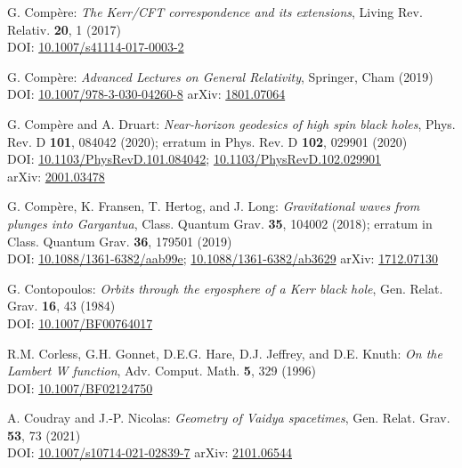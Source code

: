\begin{thebibliography}{123}
G. Compère:
{\em The Kerr/CFT correspondence and its extensions},
Living Rev. Relativ. {\bf 20}, 1 (2017)\\
DOI: \href{https://doi.org/10.1007/s41114-017-0003-2}{10.1007/s41114-017-0003-2}

G. Compère:
{\em Advanced Lectures on General Relativity},
Springer, Cham (2019)\\
DOI: \href{https://doi.org/10.1007/978-3-030-04260-8}{10.1007/978-3-030-04260-8}\hfill
arXiv: \href{https://arxiv.org/abs/1801.07064}{1801.07064}

G. Compère and A. Druart:
{\em Near-horizon geodesics of high spin black holes},
Phys. Rev. D {\bf 101}, 084042 (2020); erratum in Phys. Rev. D {\bf 102}, 029901 (2020)\\
DOI: \href{https://doi.org/10.1103/PhysRevD.101.084042}{10.1103/PhysRevD.101.084042};
\href{https://doi.org/10.1103/PhysRevD.102.029901}{10.1103/PhysRevD.102.029901}\\
arXiv: \href{https://arxiv.org/abs/2001.03478}{2001.03478}

G. Compère, K. Fransen, T. Hertog, and J. Long:
{\em Gravitational waves from plunges into Gargantua},
Class. Quantum Grav. {\bf 35}, 104002 (2018);
erratum in Class. Quantum Grav. {\bf 36}, 179501 (2019) \\
DOI: \href{https://doi.org/10.1088/1361-6382/aab99e}{10.1088/1361-6382/aab99e};
\href{https://doi.org/10.1088/1361-6382/ab3629}{10.1088/1361-6382/ab3629}
\hfill
arXiv: \href{https://arxiv.org/abs/1712.07130}{1712.07130}

G. Contopoulos:
{\em Orbits through the ergosphere of a Kerr black hole},
Gen. Relat. Grav. {\bf 16}, 43 (1984)\\
DOI: \href{https://doi.org/10.1007/BF00764017}{10.1007/BF00764017}

R.M. Corless, G.H. Gonnet, D.E.G. Hare, D.J. Jeffrey, and D.E. Knuth:
{\em On the Lambert W function},
Adv. Comput. Math. {\bf 5}, 329 (1996)\\
DOI: \href{https://doi.org/10.1007/BF02124750}{10.1007/BF02124750}

A. Coudray and J.-P. Nicolas:
{\em Geometry of Vaidya spacetimes},
Gen. Relat. Grav. {\bf 53}, 73 (2021)\\
DOI: \href{https://doi.org/10.1007/s10714-021-02839-7}{10.1007/s10714-021-02839-7}\hfill
arXiv: \href{https://arxiv.org/abs/2101.06544}{2101.06544}


\end{thebibliography}
